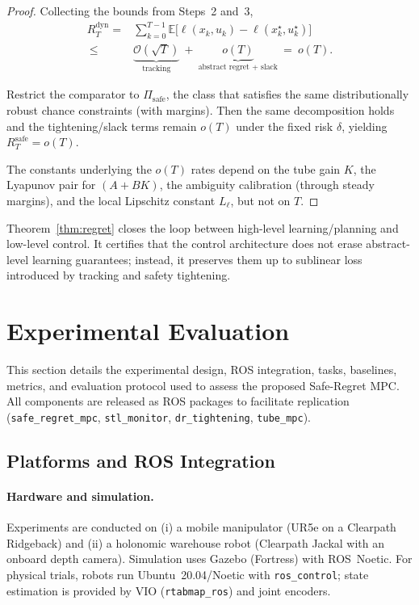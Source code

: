 \documentclass[journal]{IEEEtran}
\theoremstyle{definition}
\begin{document}
\begin{proof}
Collecting the bounds from Steps~2 and~3,
\begin{align*}
R_T^{\mathrm{dyn}}
=&\sum_{k=0}^{T-1}\mathbb{E}\big[\ell(x_k,u_k)-\ell(x_k^\star,u_k^\star)\big]\\
\ \le& \underbrace{\mathcal{O}(\sqrt{T})}_{\text{tracking}}
\ +\ \underbrace{o(T)}_{\text{abstract regret + slack}}
\ =\ o(T).
\end{align*}

 
 
Restrict the comparator to $\Pi_{\mathrm{safe}}$, the class that satisfies the same distributionally robust chance constraints (with margins). Then the same decomposition holds and the tightening/slack terms remain $o(T)$ under the fixed risk $\delta$, yielding $R_T^{\mathrm{safe}}=o(T)$.

The constants underlying the $o(T)$ rates depend on the tube gain $K$, the Lyapunov pair for $(A{+}BK)$, the ambiguity calibration (through steady margins), and the local Lipschitz constant $L_\ell$, but not on $T$.
\end{proof}

 
 Theorem~\ref{thm:regret} closes the loop between high-level learning/planning and low-level control. It certifies that the control architecture does not erase abstract-level learning guarantees; instead, it preserves them up to sublinear loss introduced by tracking and safety tightening.


\section{Experimental Evaluation}
\label{sec:experiments}

This section details the experimental design, ROS integration, tasks, baselines, metrics,
and evaluation protocol used to assess the proposed Safe-Regret MPC.
All components are released as ROS packages to facilitate replication
(\texttt{safe\_regret\_mpc}, \texttt{stl\_monitor}, \texttt{dr\_tightening}, \texttt{tube\_mpc}).

\subsection{Platforms and ROS Integration}
\paragraph*{Hardware and simulation.}
Experiments are conducted on (i) a mobile manipulator (UR5e on a Clearpath Ridgeback) and
(ii) a holonomic warehouse robot (Clearpath Jackal with an onboard depth camera).
Simulation uses Gazebo (Fortress) with ROS~Noetic.
For physical trials, robots run Ubuntu~20.04/Noetic with \texttt{ros\_control};
state estimation is provided by VIO (\texttt{rtabmap\_ros}) and joint encoders.
\end{document}
